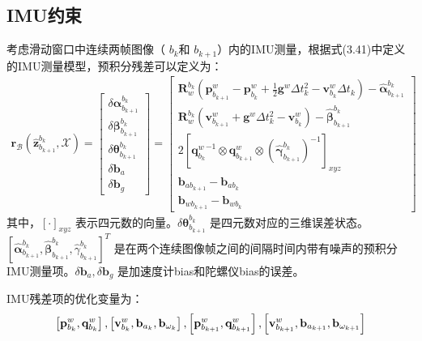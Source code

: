 \subsection{IMU约束}
考虑滑动窗口中连续两帧图像（ $b_{k} $和 $b_{k+1} $）内的IMU测量，根据式(3.41)中定义的IMU测量模型，预积分残差可以定义为：
\begin{equation}
\label{eqn:4.9}
\begin{split}
\mathbf{r}_\mathcal{B}(\hat{\mathbf{z}}_{b_{k+1}}^{b_k},\mathcal{X})=\begin{bmatrix} \delta\bm{\alpha}_{b_{k+1}}^{b_k} \\ \delta\bm{\beta}_{b_{k+1}}^{b_k} \\ \delta\bm{\theta}_{b_{k+1}}^{b_k} \\ \delta\mathbf{b}_a \\ \delta\mathbf{b}_g  \end{bmatrix}  
=\begin{bmatrix}
\mathbf{R}_w^{b_k}(\mathbf{p}_{b_{k+1}}^w-\mathbf{p}_{b_k}^w+\frac{1}{2}\mathbf{g}^w\Delta t_k^2-\mathbf{v}_{b_k}^w\Delta t_k)-\hat{\bm{\alpha}}_{b_{k+1}}^{b_k} \\
\mathbf{R}_w^{b_k}(\mathbf{v}_{b_{k+1}}^w+\mathbf{g}^w\Delta t_k^2-\mathbf{v}_{b_k}^w)-\hat{\bm{\beta}}_{b_{k+1}}^{b_k} \\
2\left[ {\mathbf{q}_{b_k}^w}^{-1}\otimes\mathbf{q}_{b_{k+1}}^w\otimes(\hat{\bm{\gamma}}_{b_{k+1}}^{b_k})^{-1} \right]_{xyz} \\ \mathbf{b}_{ab_{k+1}}-\mathbf{b}_{ab_k} \\
\mathbf{b}_{wb_{k+1}}-\mathbf{b}_{wb_k}
\end{bmatrix}
\end{split}
\end{equation}
其中，$[\cdot]_{x y z}$ 表示四元数的向量。$\delta \boldsymbol{\theta}_{b_{k+1}}^{b_{k}}$ 是四元数对应的三维误差状态。$\left[\hat{\boldsymbol{\alpha}}_{b_{k+1}}^{b_{k}}, \hat{\boldsymbol{\beta}}_{b_{k+1}}^{b_{k}}, \hat{\gamma}_{b_{k+1}}^{b_{k}}\right]^{T}$ 是在两个连续图像帧之间的间隔时间内带有噪声的预积分IMU测量项。$\delta \mathbf{b}_a, \delta \mathbf{b}_g $ 是加速度计bias和陀螺仪bias的误差。

IMU残差项的优化变量为：
\[
\setlength{\abovedisplayskip}{6pt}
\setlength{\belowdisplayskip}{6pt}
\left[ \mathbf{ p}_{b_{k}}^{w}, 
\mathbf{ q}_{b_{k}}^{w}\right],
\left[\mathbf{ v}_{b_{k}}^{w}, 
\mathbf{ b}_{a_{k}}, \mathbf{ b}_{\omega_{k}}\right], 
\left[\mathbf{ p}_{b_{k+1}}^{w}, \mathbf{q}_{b_{k+1}}^{w}\right],
\left[\mathbf{ v}_{b_{k+1}}^{w}, \mathbf{ b}_{a_{k+1}}, \mathbf{b}_{\omega_{k+1}}\right]
\]

